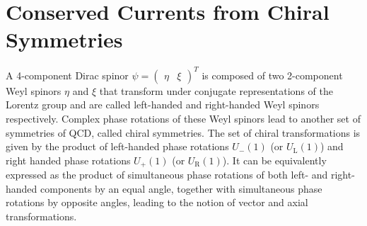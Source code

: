 \section{Conserved Currents from Chiral Symmetries}
\label{sec:ConservedCurrentsChirSym}

A 4-component Dirac spinor ${\psi=\begin{pmatrix}\eta&\xi\end{pmatrix}}^T$ is composed of two 2-component Weyl spinors $\eta$ and $\xi$ that transform under conjugate representations of the Lorentz group and are called left-handed and right-handed Weyl spinors respectively. Complex phase rotations of these Weyl spinors lead to another set of symmetries of QCD, called chiral symmetries. The set of chiral transformations is given by the product of left-handed phase rotations ${U_-(1)}$ (or ${U_{\text{L}}(1)}$) and right handed phase rotations ${U_+(1)}$ (or ${U_{\text{R}}(1)}$). It can be equivalently expressed as the product of simultaneous phase rotations of both left- and right-handed components by an equal angle, together with simultaneous phase rotations by opposite angles, leading to the notion of vector and axial transformations.

